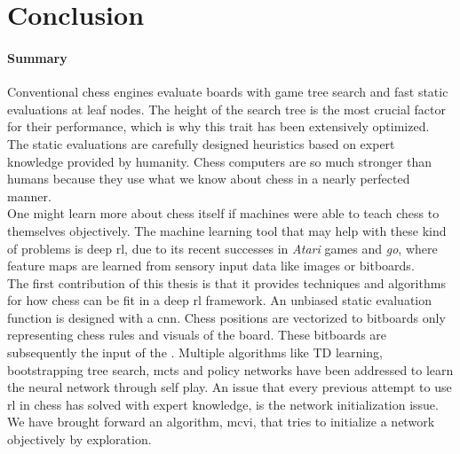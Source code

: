 \chapter{Conclusion}
\label{ch:conclusion}

\subsubsection*{Summary}
Conventional chess engines evaluate boards with game tree search and fast static evaluations at leaf nodes. The height of the search tree is the most crucial factor for their performance, which is why this trait has been extensively optimized. The static evaluations are carefully designed heuristics based on expert knowledge provided by humanity. Chess computers are so much stronger than humans because they use what we know about chess in a nearly perfected manner.\\

One might learn more about chess itself if machines were able to teach chess to themselves objectively. The machine learning tool that may help with these kind of problems is deep \acrlong{rl}, due to its recent successes in \textit{Atari} games and \textit{go}, where feature maps are learned from sensory input data like images or bitboards.\\

The first contribution of this thesis is that it provides techniques and algorithms for how chess can be fit in a deep \gls{rl} framework. An unbiased static evaluation function is designed with a \acrlong{cnn}. Chess positions are vectorized to bitboards only representing chess rules and visuals of the board. These bitboards are subsequently the input of the . Multiple algorithms like TD learning, bootstrapping tree search, \acrlong{mcts} and policy networks have been addressed to learn the neural network through self play. An issue that every previous attempt to use \gls{rl} in chess has solved with expert knowledge, is the network initialization issue. We have brought forward an algorithm, \acrlong{mcvi}, that tries to initialize a network objectively by exploration.\\

